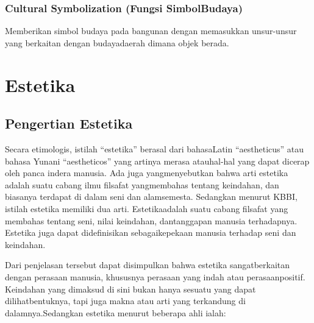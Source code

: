 \documentclass[../manperil.tex]{subfiles}
\begin{document}
\subsubsection{Cultural Symbolization (Fungsi SimbolBudaya)}%
\label{sub:cultural_symbolization_(fungsi_simbolbudaya)}

Memberikan simbol budaya pada bangunan dengan memasukkan unsur-unsur yang berkaitan dengan budayadaerah dimana objek berada.

\section{Estetika}%
\label{sec:Estetika}

\subsection{Pengertian Estetika}%
\label{sub:Pengertian Estetika}
Secara etimologis, istilah “estetika” berasal dari bahasaLatin “aestheticus” atau bahasa Yunani “aestheticos” yang artinya merasa atauhal-hal yang dapat dicerap oleh panca indera manusia. Ada juga yangmenyebutkan bahwa arti estetika adalah suatu cabang ilmu filsafat yangmembahas tentang keindahan, dan biasanya terdapat di dalam seni dan alamsemesta. Sedangkan menurut KBBI, istilah estetika memiliki dua arti. Estetikaadalah suatu cabang filsafat yang membahas tentang seni, nilai keindahan, dantanggapan manusia terhadapnya. Estetika juga dapat didefinisikan sebagaikepekaan manusia terhadap seni dan keindahan.

Dari penjelasan tersebut dapat disimpulkan bahwa estetika sangatberkaitan dengan perasaan manusia, khususnya perasaan yang indah atau perasaanpositif. Keindahan yang dimaksud di sini bukan hanya sesuatu yang dapat dilihatbentuknya, tapi juga makna atau arti yang terkandung di dalamnya.Sedangkan estetika menurut beberapa ahli ialah:
\end{document}
